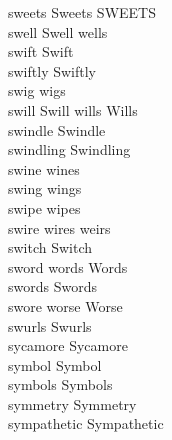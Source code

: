 sweets Sweets SWEETS\\
swell Swell wells\\
swift Swift\\
swiftly Swiftly\\
swig wigs\\
swill Swill wills Wills\\
swindle Swindle\\
swindling Swindling\\
swine wines\\
swing wings\\
swipe wipes\\
swire wires weirs\\
switch Switch\\
sword words Words\\
swords Swords\\
swore worse Worse\\
swurls Swurls\\
sycamore Sycamore\\
symbol Symbol\\
symbols Symbols\\
symmetry Symmetry\\
sympathetic Sympathetic\\

